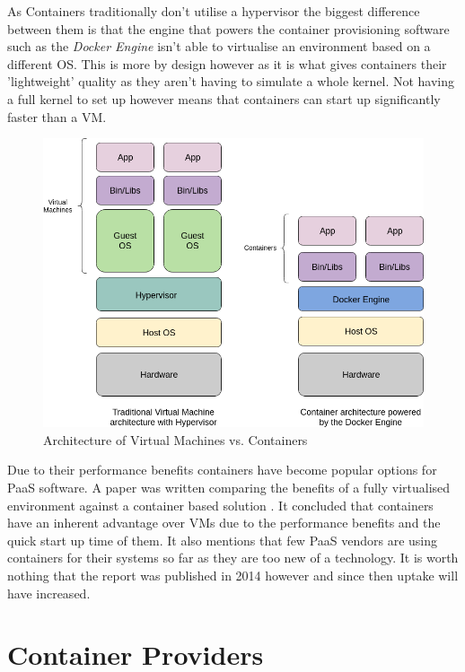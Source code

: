 As Containers traditionally don't utilise a hypervisor the biggest difference between them is that the engine that powers the container provisioning software such as the \textit{Docker Engine} isn't able to virtualise an environment based on a different OS. This is more by design however as it is what gives containers their 'lightweight' quality as they aren't having to simulate a whole kernel. Not having a full kernel to set up however means that containers can start up significantly faster than a VM.

\begin{figure}[h!]
    \centering
    \includegraphics[scale=0.4]{res/Virtualisation.png}
    \caption{Architecture of Virtual Machines vs. Containers}
    \label{fig:architecture}
\end{figure}

Due to their performance benefits containers have become popular options for PaaS software. A paper was written comparing the benefits of a fully virtualised environment against a container based solution \cite{contsvsvirt}. It concluded that containers have an inherent advantage over VMs due to the performance benefits and the quick start up time of them. It also mentions that few PaaS vendors are using containers for their systems so far as they are too new of a technology. It is worth nothing that the report was published in 2014 however and since then uptake will have increased.
\pagebreak
\section{Container Providers}

